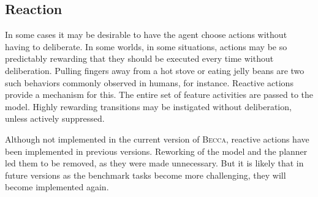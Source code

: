 \subsection{Reaction}
In some cases it may be desirable to have the agent choose actions without having to deliberate. In some worlds, in some situations, actions may be so predictably rewarding that they should be executed every time without deliberation. Pulling fingers away from a hot stove or eating jelly beans are two such behaviors commonly observed in humans, for instance. Reactive actions provide a mechanism for this. The entire set of feature activities are passed to the model. Highly rewarding transitions may be instigated without deliberation, unless actively suppressed. 

Although not implemented in the current version of \textsc{Becca}, reactive actions have been implemented in previous versions. Reworking of the model and the planner led them to be removed, as they were made unnecessary. But it is likely that in future versions as the benchmark tasks become more challenging, they will become implemented again.
